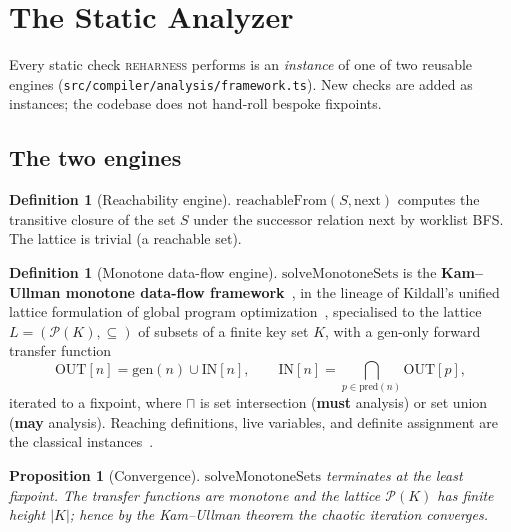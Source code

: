\documentclass[11pt]{article}
\theoremstyle{plain}
\newtheorem{proposition}[theorem]{Proposition}
\theoremstyle{definition}
\newtheorem{definition}[theorem]{Definition}
\theoremstyle{remark}
\newcommand{\reharness}{\textsc{reharness}}
\newcommand{\code}[1]{\texttt{#1}}
\newcommand{\powerset}{\mathcal{P}}
\newcommand{\meet}{\sqcap}
\newcommand{\bigmeet}{\bigcap}
\begin{document}
\section{The Static Analyzer}\label{sec:compiler-analysis}

Every static check \reharness{} performs is an \emph{instance} of one of two
reusable engines (\code{src/compiler/analysis/framework.ts}). New checks are added
as instances; the codebase does not hand-roll bespoke fixpoints.

\subsection{The two engines}\label{sec:engines}

\begin{definition}[Reachability engine]
$\mathrm{reachableFrom}(S, \mathrm{next})$ computes the transitive closure of the
set $S$ under the successor relation $\mathrm{next}$ by worklist BFS. The lattice is
trivial (a reachable set).
\end{definition}

\begin{definition}[Monotone data-flow engine]\label{def:kamullman}
$\mathrm{solveMonotoneSets}$ is the \textbf{Kam--Ullman monotone data-flow
framework}~\cite{kamullman}, in the lineage of Kildall's unified
lattice formulation of global program optimization~\cite{kildall}, specialised
to the lattice $L = (\powerset(K), \subseteq)$ of subsets of
a finite key set $K$, with a gen-only forward transfer function
\[
  \mathrm{OUT}[n] = \mathrm{gen}(n) \cup \mathrm{IN}[n], \qquad
  \mathrm{IN}[n] = \!\!\bigmeet_{p \in \mathrm{pred}(n)}\!\! \mathrm{OUT}[p],
\]
iterated to a fixpoint, where $\meet$ is set intersection
(\textbf{must} analysis) or set union (\textbf{may} analysis). Reaching
definitions, live variables, and definite assignment are the classical
instances~\cite{dragon,nielson}.
\end{definition}

\begin{proposition}[Convergence]\label{prop:converge}
$\mathrm{solveMonotoneSets}$ terminates at the least fixpoint. The transfer
functions are monotone and the lattice $\powerset(K)$ has finite height $|K|$;
hence by the Kam--Ullman theorem the chaotic iteration converges.
\end{proposition}
\end{document}
